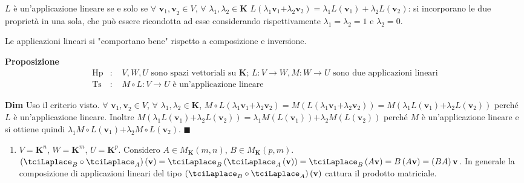 \documentclass{article}
\begin{document}
$L$ \`{e} un'applicazione lineare se e solo se $\forall $ $\mathbf{v}_{1}%
\mathbf{,v}_{2}\in V$, $\forall $ $\lambda _{1},\lambda _{2}\in \mathbf{K}$ $%
L\left( \lambda _{1}\mathbf{v}_{1}\mathbf{+}\lambda _{2}\mathbf{v}%
_{2}\right) =\lambda _{1}L\left( \mathbf{v}_{1}\right) +\lambda _{2}L\left( 
\mathbf{v}_{2}\right) $: si incorporano le due propriet\`{a} in una sola,
che pu\`{o} essere ricondotta ad esse considerando rispettivamente $\lambda
_{1}=\lambda _{2}=1$ e $\lambda _{2}=0$.

Le applicazioni lineari si "comportano bene" rispetto a composizione e
inversione.

\textbf{Proposizione}%
\begin{eqnarray*}
\text{Hp} &\text{: }&V,W,U\text{ sono spazi vettoriali su }\mathbf{K}\text{; 
}L:V\rightarrow W,M:W\rightarrow U\text{ sono due applicazioni lineari} \\
\text{Ts} &\text{: }&M\circ L:V\rightarrow U\text{ \`{e} un'applicazione
lineare}
\end{eqnarray*}

\textbf{Dim} Uso il criterio visto. $\forall $ $\mathbf{v}_{1}\mathbf{,v}%
_{2}\in V$, $\forall $ $\lambda _{1},\lambda _{2}\in \mathbf{K}$, $M\circ
L\left( \lambda _{1}\mathbf{v}_{1}\mathbf{+}\lambda _{2}\mathbf{v}%
_{2}\right) =M\left( L\left( \lambda _{1}\mathbf{v}_{1}\mathbf{+}\lambda _{2}%
\mathbf{v}_{2}\right) \right) =M\left( \lambda _{1}L\left( \mathbf{v}%
_{1}\right) \mathbf{+}\lambda _{2}L\left( \mathbf{v}_{2}\right) \right) $
perch\'{e} $L$ \`{e} un'applicazione lineare. Inoltre $M\left( \lambda
_{1}L\left( \mathbf{v}_{1}\right) \mathbf{+}\lambda _{2}L\left( \mathbf{v}%
_{2}\right) \right) =\lambda _{1}M\left( L\left( \mathbf{v}_{1}\right)
\right) \mathbf{+}\lambda _{2}M\left( L\left( \mathbf{v}_{2}\right) \right) $
perch\'{e} $M$ \`{e} un'applicazione lineare e si ottiene quindi $\lambda
_{1}M\circ L\left( \mathbf{v}_{1}\right) \mathbf{+}\lambda _{2}M\circ
L\left( \mathbf{v}_{2}\right) $. $\blacksquare $

\begin{enumerate}
\item $V=\mathbf{K}^{n}$, $W=\mathbf{K}^{m}$, $U=\mathbf{K}^{p}$. Considero $%
A\in M_{\mathbf{K}}\left( m,n\right) $, $B\in M_{\mathbf{K}}\left(
p,m\right) $. $\left( \tciLaplace _{B}\circ \tciLaplace _{A}\right) \left( 
\mathbf{v}\right) =\tciLaplace _{B}\left( \tciLaplace _{A}\left( \mathbf{v}%
\right) \right) =\tciLaplace _{B}\left( A\mathbf{v}\right) =B\left( A\mathbf{%
v}\right) =\left( BA\right) \mathbf{v}$. In generale la composizione di
applicazioni lineari del tipo $\left( \tciLaplace _{B}\circ \tciLaplace
_{A}\right) \left( \mathbf{v}\right) $ cattura il prodotto matriciale.
\end{enumerate}
\end{document}
